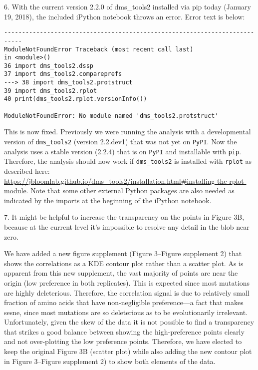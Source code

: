 \documentclass[11pt, oneside]{article}   	%
\begin{document}
6. With the current version 2.2.0 of dms\_tools2 installed via pip today (January 19, 2018), the included iPython notebook throws an error. Error text is below: 
\begin{verbatim}
--------------------------------------------------------------------------- 
ModuleNotFoundError Traceback (most recent call last) 
in <module>() 
36 import dms_tools2.dssp 
37 import dms_tools2.compareprefs 
---> 38 import dms_tools2.protstruct 
39 import dms_tools2.rplot 
40 print(dms_tools2.rplot.versionInfo()) 

ModuleNotFoundError: No module named 'dms_tools2.protstruct'
\end{verbatim}

{\color{black}
This is now fixed.
Previously we were running the analysis with a developmental version of \texttt{dms\_tools2} (version 2.2.dev1) that was not yet on \texttt{PyPI}.
Now the analysis uses a stable version (2.2.4) that is on \texttt{PyPI} and installable with \texttt{pip}.
Therefore, the analysis should now work if \texttt{dms\_tools2} is installed with \texttt{rplot} as described here: \url{https://jbloomlab.github.io/dms_tools2/installation.html#installing-the-rplot-module}.
Note that some other external Python packages are also needed as indicated by the imports at the beginning of the iPython notebook.
}

7. It might be helpful to increase the transparency on the points in Figure 3B, because at the current level it's impossible to resolve any detail in the blob near zero. 

{\color{black}
We have added a new figure supplement (Figure 3--Figure supplement 2) that shows the correlations as a KDE contour plot rather than a scatter plot.
As is apparent from this new supplement, the vast majority of points are near the origin (low preference in both replicates). 
This is expected since most mutations are highly deleterious.
Therefore, the correlation signal is due to relatively small fraction of amino acids that have non-negligible preference---a fact that makes sesne, since most mutations are so deleterious as to be evolutionarily irrelevant.
Unfortunately, given the skew of the data it is not possible to find a transparency that strikes a good balance between showing the high-preference points clearly and not over-plotting the low preference points.
Therefore, we have elected to keep the original Figure 3B (scatter plot) while also adding the new contour plot in Figure 3--Figure supplement 2) to show both elements of the data.
}
\end{document}
